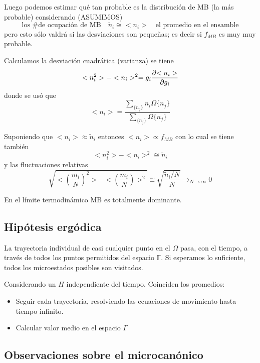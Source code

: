 \documentclass[10pt,oneside]{CBFT_book}
\begin{document}
Luego podemos estimar qué tan probable es la distribución de MB (la más probable) considerando
(ASUMIMOS)
\[
	\text{los \# de ocupación de MB} \quad \tilde{n}_i \cong <n_i> \quad \text{el promedio en el ensamble}
\]
pero esto sólo valdrá si las desviaciones son pequeñas; es decir si $f_{MB}$ es muy muy probable.

Calculamos la desviación cuadrática (varianza) se tiene 
\[
	<n_i^2> - <n_i>^2 = g_i \frac{\partial^{\hspace{-0.05em}} {<n_i>}}{\partial {g_i}^{\hspace{-0.05em}}}
\]
donde se usó que 
\[
	<n_i> = \frac{\sum_{\{ n_j\}} n_i \Omega\{ n_j\} }{\sum_{\{ n_j\}} \Omega\{ n_j\}}
\]

Suponiendo que $ <n_i> \approx \tilde{n}_i$ entonces $ <n_i>  \propto f_{MB}$ con lo cual se tiene también 
\[
	<n_i^2> - <n_i>^2 \cong \tilde{n}_i
\]
y las fluctuaciones relativas
\[
	\sqrt{<\left( \frac{m_i}{N}\right)^2 > - <\left( \frac{m_i}{N}\right) >^2 } \cong 
	\sqrt{ \frac{ \tilde{n}_i/N }{N} }\to_{N\to\infty} 0
\]

En el límite termodinámico MB es totalmente dominante.

\subsection{Hipótesis ergódica}

La trayectoria individual de casi cualquier punto en el $\Omega$ pasa, con el tiempo, a través de todos los
puntos permitidos del espacio $\mathbb{\Gamma}$. Si esperamos lo suficiente, todos los microestados posibles
son visitados.

Considerando un $H$ independiente del tiempo. Coinciden los promedios:
\begin{itemize}
 \item Seguir cada trayectoria, resolviendo las ecuaciones de movimiento hasta tiempo infinito.
 \item Calcular valor medio en el espacio $\Gamma$
\end{itemize}


\subsection{Observaciones sobre el microcanónico}
\end{document}
